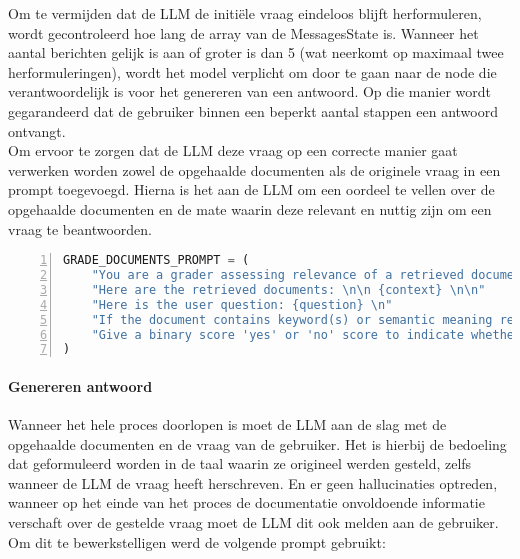 Om te vermijden dat de LLM de initiële vraag eindeloos blijft herformuleren, wordt gecontroleerd hoe lang de array van de MessagesState is. Wanneer het aantal berichten gelijk is aan of groter is dan 5 (wat neerkomt op maximaal twee herformuleringen), wordt het model verplicht om door te gaan naar de node die verantwoordelijk is voor het genereren van een antwoord. Op die manier wordt gegarandeerd dat de gebruiker binnen een beperkt aantal stappen een antwoord ontvangt.
\\[1em]
Om ervoor te zorgen dat de LLM deze vraag op een correcte manier gaat verwerken worden zowel de opgehaalde documenten als de originele vraag in een prompt toegevoegd. Hierna is het aan de LLM om een oordeel te vellen over de opgehaalde documenten en de mate waarin deze relevant en nuttig zijn om een vraag te beantwoorden.
\begin{lstlisting}[basicstyle=\small, frame=single, breaklines=true, postbreak=\mbox{\textcolor{red}{$\hookrightarrow$}\space}, escapeinside ={\%,}, escapechar={!}, numbers=left, language=Python, caption=Beoordeling documenten prompt]
GRADE_DOCUMENTS_PROMPT = (
    "You are a grader assessing relevance of a retrieved document to a user question. \n "
    "Here are the retrieved documents: \n\n {context} \n\n"
    "Here is the user question: {question} \n"
    "If the document contains keyword(s) or semantic meaning related to the user question, grade it as relevant. \n"
    "Give a binary score 'yes' or 'no' score to indicate whether the document is relevant to the question."
)
\end{lstlisting}

\paragraph{Genereren antwoord}

Wanneer het hele proces doorlopen is moet de LLM aan de slag met de opgehaalde documenten en de vraag van de gebruiker. Het is hierbij de bedoeling dat geformuleerd worden in de taal waarin ze origineel werden gesteld, zelfs wanneer de LLM de vraag heeft herschreven. En er geen hallucinaties optreden, wanneer op het einde van het proces de documentatie onvoldoende informatie verschaft over de gestelde vraag moet de LLM dit ook melden aan de gebruiker. Om dit te bewerkstelligen werd de volgende prompt gebruikt: 

